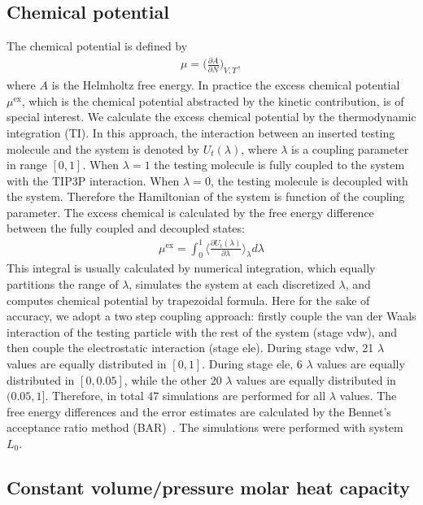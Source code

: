 \documentclass[a4paper,preprint,unsortedaddress,onecolumn,fleqn]{revtex4}
\begin{document}
\subsection{Chemical potential}

The chemical potential is defined by 
\begin{align}
\mu = \Big(\frac{\partial A}{\partial N}\Big)_{V,T},
\end{align}
where $A$ is the Helmholtz free energy. In practice the excess chemical
potential $\mu^\text{ex}$, which is the chemical potential abstracted by the
kinetic contribution, is of special interest. We calculate the excess
chemical potential by the thermodynamic integration (TI). In this approach,
the interaction between an inserted testing molecule and the system is
denoted by $U_t(\lambda)$, where $\lambda$ is a coupling parameter in range $%
[0,1]$. When $\lambda = 1$ the testing molecule is fully coupled to the
system with the TIP3P interaction. When $\lambda=0$, the testing molecule is
decoupled with the system. Therefore the Hamiltonian of the system is
function of the coupling parameter. The excess chemical is calculated by the
free energy difference between the fully coupled and decoupled states: 
\begin{align}
\mu^\text{ex} = \int_0^1 \Big\langle \frac{\partial U_t(\lambda)}{\partial
\lambda} \Big\rangle_\lambda d\lambda
\end{align}
This integral is usually calculated by numerical integration, which equally
partitions the range of $\lambda$, simulates the system at each discretized $%
\lambda$, and computes chemical potential by trapezoidal formula. Here for
the sake of accuracy, we adopt a two step coupling approach: firstly couple
the van der Waals interaction of the testing particle with the rest of the
system (stage vdw), and then couple the electrostatic interaction (stage
ele). During stage vdw, 21 $\lambda$ values are equally distributed in $%
[0,1] $. During stage ele, 6 $\lambda$ values are equally distributed in $%
[0,0.05]$, while the other 20 $\lambda$ values are equally distributed in $%
(0.05, 1]$. Therefore, in total 47 simulations are performed for all $%
\lambda $ values. The free energy differences and the error estimates are
calculated by the Bennet's acceptance ratio method (BAR)~\cite%
{bennett1976efficient}. The simulations were performed with system $L_0$.

\subsection{Constant volume/pressure molar heat capacity}
\end{document}
